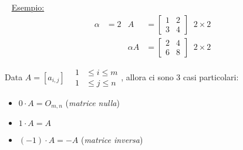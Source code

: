 \documentclass[12pt,oneside]{book}
\begin{document}
~\newline
\underline{Esempio:}
\begin{align*}
    \alpha & = 2 & A &= \begin{bmatrix}
        1 & 2 \\
        3 & 4
    \end{bmatrix} \;\; 2 \times 2 \\
    & &    
    \alpha A &= \begin{bmatrix}
        2 & 4 \\
        6 & 8
    \end{bmatrix} \;\; 2 \times 2 
\end{align*}

Data $A=[a_{i,j}]\;\;\; \begin{aligned} 1&\le i\le m\\ 1&\le j\le n \end{aligned}$, allora ci sono 3 casi particolari:
\begin{itemize}
    \item $0 \cdot A = O_{m,n}$ (\emph{matrice nulla})
    \item $1 \cdot A = A$
    \item $(-1) \cdot A = -A$ (\emph{matrice inversa})
\end{itemize}
\end{document}
